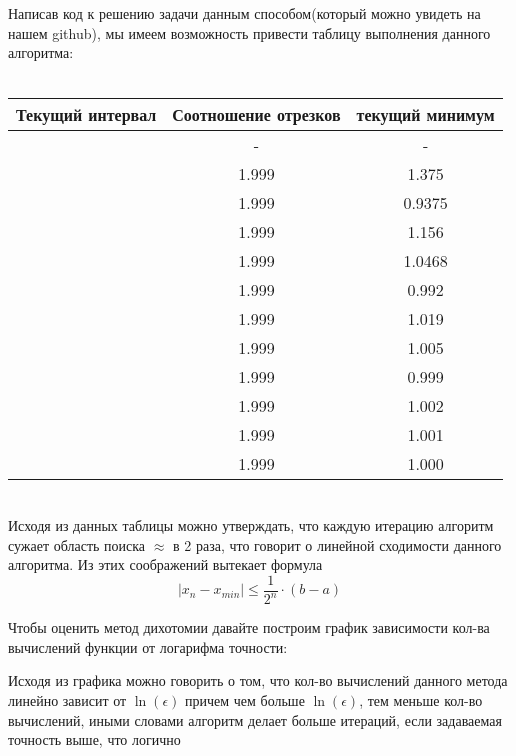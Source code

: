 \documentclass[a4paper, 14pt]{article}
\begin{document}
	Написав код к решению задачи данным способом(который можно увидеть на нашем github), мы имеем возможность привести таблицу выполнения данного алгоритма:\\\\
	\begin{tabular}{|c |c| c|}
		\hline
		Текущий интервал & Соотношение отрезков & текущий минимум \\
		\hline
		[0.5, 4] & - & - \\
		\hline
		[0.5, 2.25] & 1.999 & 1.375 \\
		\hline
		[0.5 1.375] & 1.999 & 0.9375 \\
		\hline
		[0.973, 1.375] & 1.999 & 1.156 \\
		\hline
		[0.973, 1.156] & 1.999 & 1.0468 \\
		\hline
		[0.973, 1.0468] & 1.999 & 0.992 \\
		\hline
		[0.992, 1.0468] & 1.999 & 1.019 \\
		\hline
		[0.992, 1.019] & 1.999 & 1.005 \\
		\hline
		[0.992, 1.005] & 1.999 & 0.999 \\
		\hline
		[0.999, 1.005] & 1.999 & 1.002 \\
		\hline
		[0.999, 1.002] & 1.999 & 1.001 \\
		\hline
		[0.999, 1.001] & 1.999 & 1.000 \\
		\hline
	\end{tabular} \\

	Исходя из данных таблицы можно утверждать, что каждую итерацию алгоритм сужает область поиска $\approx$ в 2 раза, что говорит о линейной сходимости данного алгоритма. Из этих соображений вытекает формула
	\[|x_n - x_{min}| \leqslant \frac{1}{2^n} \cdot (b - a)\]

	Чтобы оценить метод дихотомии давайте построим график зависимости кол-ва вычислений функции от логарифма точности:



	Исходя из графика можно говорить о том, что кол-во вычислений данного метода линейно зависит от $\ln(\epsilon)$ причем чем больше $\ln(\epsilon)$, тем меньше кол-во вычислений, иными словами алгоритм делает больше итераций, если задаваемая точность выше, что логично\\
	
\end{document}
